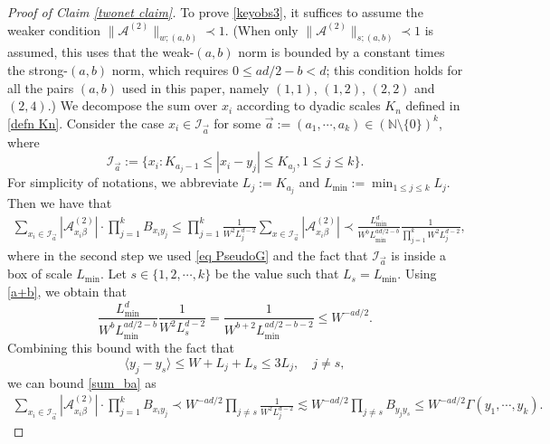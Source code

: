 \documentclass{article}
\newcommand{\1}{\mathds{1}}
\numberwithin{equation}{section}
\newcommand{\al}{\alpha}
\newcommand{\be}{\begin{equation}}
\newcommand{\ee}{\end{equation}}
\renewcommand{\cal}{\mathcal}
\renewcommand{\leq}{\leqslant}
\renewcommand{\le}{\leq}
\newcommand{\N}{\mathbb{N}}
\theoremstyle{plain} %
\theoremstyle{remark}
\begin{document}
\begin{proof}[Proof of Claim \ref{twonet claim}]
To prove \eqref{keyobs3}, it suffices to assume the weaker condition $\|\cal A^{(2)}\|_{w;(a,b)}\prec 1$. (When only $\|\cal A^{(2)}\|_{s;(a,b)}\prec 1$ is assumed, this uses that the weak-$(a,b)$ norm is bounded by a constant times the strong-$(a,b)$ norm, which requires $0\le ad/2-b<d$; this condition holds for all the pairs $(a,b)$ used in this paper, namely $(1,1)$, $(1,2)$, $(2,2)$ and $(2,4)$.) We decompose the sum over $x_i$ according to dyadic scales $K_n$ defined in \eqref{defn Kn}. Consider the case $x_i \in \cal I_{\vec a}$ for some $\vec a:=(a_1, \cdots, a_k)\in (\N\setminus\{0\})^k$, where 
$$\cal I_{\vec a}:=\{ x_i: K_{a_j-1} \le |x_i - y_j| \le K_{a_j} ,  1\le j \le k\}.$$ For simplicity of notations, we abbreviate $L_j := K_{a_j}$ and $L_{\min}:=\min_{1\le j \le k}L_j $. Then we have that 
\begin{align}\label{sum_ba}
\sum_{x_i \in \cal I_{\vec a}} |\cal A^{(2)}_{x_i \beta}|\cdot \prod_{j=1}^k B_{x_i y_j }\le \prod_{j=1}^k\frac{1}{W^2L_j^{d-2}} \sum_{x\in \cal I_{\vec a}}  |\cal A ^{(2)}_{x_i \beta}|  \prec   \frac{L_{\min}^{d}}{W^bL_{\min}^{ad/2-b} }\frac{1}{\prod_{j=1}^k W^2L_j^{d-2}} ,  
\end{align}  
where in the second step we used \eqref{eq PseudoG} and the fact that $\cal I_{\vec a}$ is inside a box of scale $L_{\min}$.
Let $s \in \{1,2,\cdots, k\}$ be the value such that $L_s=L_{\min}$. Using \eqref{a+b}, we obtain that
$$\frac{L_{\min}^{d}}{ W^b L_{\min}^{ad/2-b} } \frac1{W^2L_s^{d-2}} = \frac{1}{W^{b+2}L_{\min}^{ad/2-b-2}}\le W^{-ad/2}.$$
Combining this bound with the fact that  
\be\label{yj-s}\langle y_j - y_s \rangle \le W+ L_j + L_s \le 3L_j,\quad j \ne s, \ee  
we can bound \eqref{sum_ba} as 
 \begin{align}
 \sum_{x_i \in \cal I_{\vec a}} |\cal A^{(2)}_{x_i \beta}|\cdot \prod_{j=1}^k B_{x_i y_j } \prec W^{-ad/2} \prod_{j\ne s} \frac1{W^2L_j^{d-2}} \lesssim W^{-ad/2} \prod_{j\ne s} B_{y_j y_s} \le  W^{-ad/2}{\Gamma(y_1,\cdots, y_k)} . \nonumber

\end{align}
\end{proof}
\end{document}
